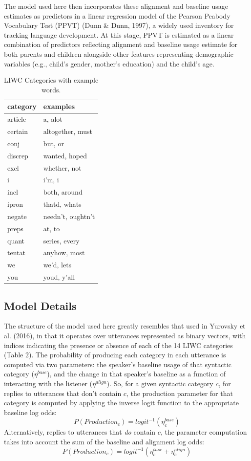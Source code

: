 \documentclass[10pt, letterpaper]{article}
\begin{document}
The model used here then incorporates these alignment and baseline usage
estimates as predictors in a linear regression model of the Pearson
Peabody Vocabulary Test (PPVT) (Dunn \& Dunn, 1997), a widely used
inventory for tracking language development. At this stage, PPVT is
estimated as a linear combination of predictors reflecting alignment and
baseline usage estimate for both parents and children alongside other
features representing demographic variables (e.g., child's gender,
mother's education) and the child's age.

\begin{table}[H]
\centering
\begin{tabular}{ll}
  \hline
category & examples \\ 
  \hline
article & a, alot \\ 
  certain & altogether, must \\ 
  conj & but, or \\ 
  discrep & wanted, hoped \\ 
  excl & whether, not \\ 
  i & i'm, i \\ 
  incl & both, around \\ 
  ipron & thatd, whats \\ 
  negate & needn't, oughtn't \\ 
  preps & at, to \\ 
  quant & series, every \\ 
  tentat & anyhow, most \\ 
  we & we'd, lets \\ 
  you & youd, y'all \\ 
   \hline
\end{tabular}
\caption{LIWC Categories with example words.} 
\end{table}

\hypertarget{model-details}{%
\subsection{Model Details}\label{model-details}}

The structure of the model used here greatly resembles that used in
Yurovsky et al. (2016), in that it operates over utterances represented
as binary vectors, with indices indicating the presence or absence of
each of the 14 LIWC categories (Table 2). The probability of producing
each category in each utterance is computed via two parameters: the
speaker's baseline usage of that syntactic category (\(\eta^{base}\)),
and the change in that speaker's baseline as a function of interacting
with the listener (\(\eta^{align}\)). So, for a given syntactic category
\(c\), for replies to utterances that don't contain \(c\), the
production parameter for that category is computed by applying the
inverse logit function to the appropriate baseline log odds: \[
P(Production_c) = logit^{-1}(\eta^{base}_c)
\] Alternatively, replies to utterances that \emph{do} contain \(c\),
the parameter computation takes into account the sum of the baseline and
alignment log odds: \[
P(Production_c) = logit^{-1}(\eta^{base}_c+\eta^{align}_c)
\]
\end{document}

